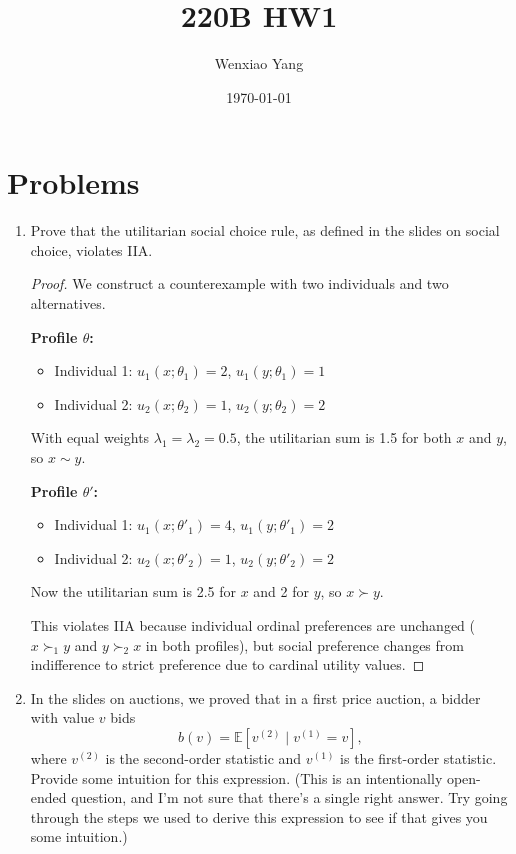 \documentclass[12pt]{article}
\author{Wenxiao Yang}
\date{\today}
\begin{document}
\title{220B HW1}
\maketitle

\section*{Problems}

\begin{enumerate}

\item Prove that the utilitarian social choice rule, as defined in the slides on social choice, violates IIA.
\begin{proof}
We construct a counterexample with two individuals and two alternatives.

\noindent \textbf{Profile $\theta$:}
\begin{itemize}
    \item Individual 1: $u_1(x;\theta_1) = 2$, $u_1(y;\theta_1) = 1$ 
    \item Individual 2: $u_2(x;\theta_2) = 1$, $u_2(y;\theta_2) = 2$
\end{itemize}

With equal weights $\lambda_1 = \lambda_2 = 0.5$, the utilitarian sum is 1.5 for both $x$ and $y$, so $x \sim y$.

\noindent \textbf{Profile $\theta'$:}
\begin{itemize}
    \item Individual 1: $u_1(x;\theta'_1) = 4$, $u_1(y;\theta'_1) = 2$ 
    \item Individual 2: $u_2(x;\theta'_2) = 1$, $u_2(y;\theta'_2) = 2$
\end{itemize}

Now the utilitarian sum is 2.5 for $x$ and 2 for $y$, so $x \succ y$.

This violates IIA because individual ordinal preferences are unchanged ($x \succ_1 y$ and $y \succ_2 x$ in both profiles), but social preference changes from indifference to strict preference due to cardinal utility values.
\end{proof}
\item In the slides on auctions, we proved that in a first price auction, a bidder with value $v$ bids
\[
b(v) = \mathbb{E} \left[ v^{(2)} \mid v^{(1)} = v \right],
\]
where $v^{(2)}$ is the second-order statistic and $v^{(1)}$ is the first-order statistic. Provide some intuition for this expression. (This is an intentionally open-ended question, and I’m not sure that there’s a single right answer. Try going through the steps we used to derive this expression to see if that gives you some intuition.)


\end{enumerate}
\end{document}
